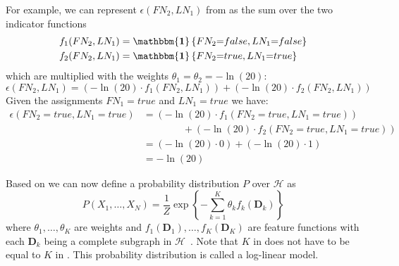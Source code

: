 For example, we can represent $\epsilon(FN_2,LN_1)$ from  as the sum over the two indicator functions
\begin{equation*}
  \begin{split}
    f_1(FN_2,LN_1)&=\mathbf{\mathbbm{1}}\left\{FN_2{=}false,LN_1{=}false\right\}\\
    f_2(FN_2,LN_1)&=\mathbf{\mathbbm{1}}\left\{FN_2{=}true,LN_1{=}true\right\}
  \end{split}
\end{equation*}
which are multiplied with the weights $\theta_1{=}\theta_2{=}-\ln(20)$:
\begin{equation*}
  \epsilon\left(FN_2,LN_1\right)=\left(-\ln(20)\cdot f_1(FN_2,LN_1)\right)+\left(-\ln(20)\cdot f_2(FN_2,LN_1)\right)
\end{equation*}
Given the assignments $FN_1{=}true$ and $LN_1{=}true$ we have:
\begin{equation*}
  \begin{split}
  \epsilon\left(FN_2{=}true,LN_1{=}true\right)&=\left(-\ln(20)\cdot f_1(FN_2{=}true,LN_1{=}true)\right)\\
  &\hspace{4em}+\left(-\ln(20)\cdot f_2(FN_2{=}true,LN_1{=}true)\right)\\
  &=\left(-\ln(20)\cdot 0\right)+\left(-\ln(20)\cdot 1\right)\\
  &=-\ln(20)
  \end{split}
\end{equation*}



\bigskip

Based on  we can now define a \gls{probability distribution} $P$ over $\mathcal{H}$ as
\begin{equation}
  \label{equ:log-linear-model}
  P\left(X_1,\dots,X_N\right) = \frac{1}{Z}\exp\left\{-\sum_{k=1}^K \theta_k f_k\left(\mathbf{D}_k\right)\right\}
\end{equation}
where $\theta_1,\dots,\theta_K$ are weights and $f_1(\mathbf{D}_1),\dots,f_K(\mathbf{D}_K)$ are \glspl{feature function} with each $\mathbf{D}_k$ being a complete subgraph in $\mathcal{H}$~\citep{koller2009probabilistic}.
Note that $K$ in  does not have to be equal to $K$ in .
This \gls{probability distribution} is called a \gls{log-linear model}.

\bigskip

